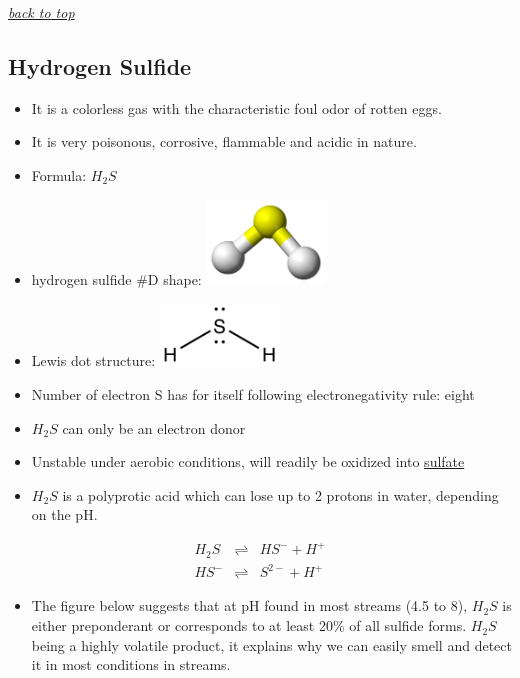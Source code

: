 \documentclass[]{book}
\providecommand{\tightlist}{%
  \setlength{\itemsep}{0pt}\setlength{\parskip}{0pt}}
\theoremstyle{definition}
\theoremstyle{definition}
\theoremstyle{definition}
\theoremstyle{remark}
\begin{document}
\emph{\protect\hyperlink{top}{back to top}}

\hypertarget{H2S}{\subsection{Hydrogen Sulfide}\label{H2S}}

\begin{itemize}
\tightlist
\item
  It is a colorless gas with the characteristic foul odor of rotten
  eggs.
\item
  It is very poisonous, corrosive, flammable and acidic in nature.
\item
  Formula: \(H_2S\)
\item
  hydrogen sulfide \#D shape:
  \includegraphics[width=0.25000\textwidth]{pictures/Hydrogen-sulfide-3D-balls.png}
\item
  Lewis dot structure:
  \includegraphics[width=0.25000\textwidth]{pictures/H2S_Lewis_structure.png}
\item
  Number of electron S has for itself following electronegativity rule:
  eight
\item
  \(H_2S\) can only be an electron donor
\item
  Unstable under aerobic conditions, will readily be oxidized into
  \protect\hyperlink{SO4}{sulfate}
\item
  \(H_2S\) is a polyprotic acid which can lose up to 2 protons in water,
  depending on the pH.
\end{itemize}

\begin{align}
H_2S & \rightleftharpoons & HS^- + H^+ \label{eq:H2S} \\
HS^- & \rightleftharpoons & S^{2-}+ H^+ \label{eq:HS} 
\end{align}

\begin{itemize}
\tightlist
\item
  The figure below suggests that at pH found in most streams (4.5 to 8),
  \(H_2S\) is either preponderant or corresponds to at least 20\% of all
  sulfide forms. \(H_2S\) being a highly volatile product, it explains
  why we can easily smell and detect it in most conditions in streams.
\end{itemize}
\end{document}
